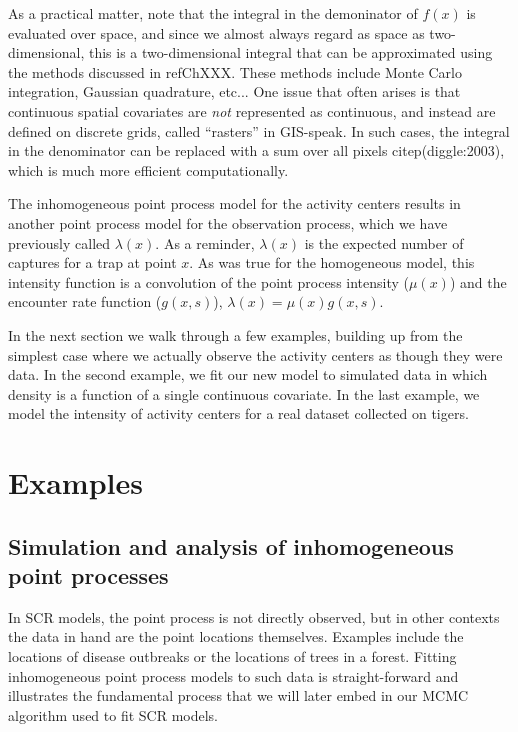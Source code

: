 As a practical matter, note that the integral in the
demoninator of $f(x)$ is evaluated over space, and since we almost always regard as
space as two-dimensional, this is a two-dimensional integral that can
be approximated using the methods discussed in ref{ChXXX}. These methods include
Monte Carlo integration, Gaussian quadrature, etc... One
issue that often arises is that continuous spatial covariates are
\emph{not} represented as continuous, and instead are
defined on discrete grids, called ``rasters'' in GIS-speak. In such
cases, the integral in the denominator can be replaced with a sum over
all pixels citep(diggle:2003), which is much more efficient
computationally.

The inhomogeneous point process model for the activity centers results
in another point process model for the
observation process, which we have previously called $\lambda(x)$. As
a reminder, $\lambda(x)$ is the expected number of captures for a trap
at point $x$. As was true for the homogeneous model, this
intensity function is a convolution of the point process intensity
($\mu(x)$) and the encounter rate function ($g(x,s)$),
$\lambda(x) = \mu(x) g(x,s)$.

In the next section we walk through a few examples, building up from
the simplest case where we actually observe the activity centers as
though they were data. In the second example, we fit our new model to simulated
data in which density is a function of a single continuous
covariate. In the last example, we model the intensity of activity
centers for a real dataset collected on tigers.

\section{Examples}

\subsection{Simulation and analysis of inhomogeneous point processes}

In SCR models, the point process is not directly observed, but in
other contexts the data in hand are the point locations
themselves. Examples include the locations of disease
outbreaks or the locations of trees in a forest. Fitting inhomogeneous
point process models to such data is straight-forward and illustrates
the fundamental process that we will later embed in our MCMC algorithm
used to fit SCR models.

